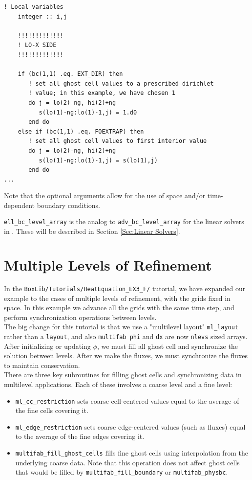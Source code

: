 \begin{lstlisting}[backgroundcolor=\color{light-green}]
    ! Local variables
    integer :: i,j

    !!!!!!!!!!!!!
    ! LO-X SIDE
    !!!!!!!!!!!!!

    if (bc(1,1) .eq. EXT_DIR) then
       ! set all ghost cell values to a prescribed dirichlet
       ! value; in this example, we have chosen 1
       do j = lo(2)-ng, hi(2)+ng
          s(lo(1)-ng:lo(1)-1,j) = 1.d0
       end do
    else if (bc(1,1) .eq. FOEXTRAP) then
       ! set all ghost cell values to first interior value
       do j = lo(2)-ng, hi(2)+ng
          s(lo(1)-ng:lo(1)-1,j) = s(lo(1),j)
       end do
...
\end{lstlisting}

Note that the optional arguments allow for the use of space and/or time-dependent
boundary conditions.

{\tt ell\_bc\_level\_array} is the analog to {\tt adv\_bc\_level\_array} for the linear 
solvers in \BoxLib.  These will be described in Section \ref{Sec:Linear Solvers}.

\section{Multiple Levels of Refinement}\label{Sec:Refinement}
In the {\tt BoxLib/Tutorials/HeatEquation\_EX3\_F/} tutorial, we have expanded our example
to the cases of multiple levels of refinement, with the grids fixed in space.  
In this example we advance all the grids
with the same time step, and perform synchronization operations between levels.\\

The big change for this tutorial is that we use a "multilevel layout" {\tt ml\_layout} 
rather than a {\tt layout}, and also {\tt multifab phi} and {\tt dx} are now {\tt nlevs} sized arrays.
After initializing or updating $\phi$, we must fill all ghost cell and synchronize the solution between
levels.  After we make the fluxes, we must synchronize the fluxes to maintain conservation.\\

There are three key subroutines for filling ghost cells and synchronizing data in multilevel applications.
Each of these involves a coarse level and a fine level:
\begin{itemize}

\item {\tt ml\_cc\_restriction} sets coarse cell-centered values equal to the average of the fine
  cells covering it.

\item {\tt ml\_edge\_restriction} sets coarse edge-centered values (such as fluxes) equal to the average
  of the fine edges covering it.

\item {\tt multifab\_fill\_ghost\_cells} fills fine ghost cells using interpolation from the underlying coarse
  data.  Note that this operation does not affect ghost cells that would be filled by {\tt multifab\_fill\_boundary}
  or {\tt multifab\_physbc}.

\end{itemize}

